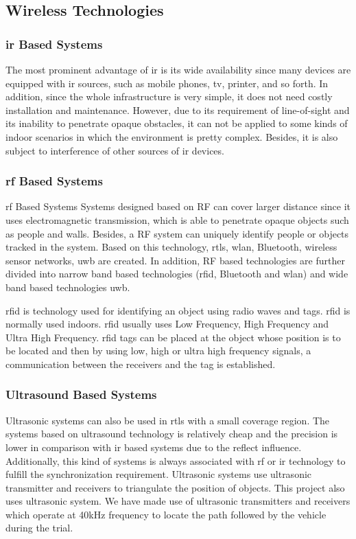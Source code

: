 \subsection{Wireless Technologies}

\subsubsection{\gls{ir} Based Systems}
The most prominent advantage of \gls{ir} is its wide availability since many devices are equipped with \gls{ir} sources, such as mobile phones, \gls{tv}, printer, and so forth. In addition, since the whole infrastructure is very simple, it does not need costly installation and maintenance. However, due to its requirement of line-of-sight and its inability to penetrate
opaque obstacles, it can not be applied to some kinds of indoor scenarios in which the environment is pretty complex. Besides, it is also subject to interference of other sources of \gls{ir} devices.

\subsubsection{\gls{rf} Based Systems}
\gls{rf} Based Systems Systems designed based on RF can cover larger distance since it uses electromagnetic transmission, which is able to penetrate opaque objects such as people and walls. Besides, a RF system can uniquely identify people or objects tracked in the system. Based on this technology, \gls{rtls}, \gls{wlan}, Bluetooth, wireless sensor networks, \gls{uwb} are created. In addition, RF based technologies are further divided into narrow band based technologies (\gls{rfid}, Bluetooth and \gls{wlan}) and wide band based technologies \gls{uwb}.

\gls{rfid} is technology used for identifying an object using radio waves and tags. \gls{rfid} is normally used indoors. \gls{rfid} usually uses Low Frequency, High Frequency and Ultra High Frequency. \gls{rfid} tags can be placed at the object whose position is to be located and then by using low, high or ultra high frequency signals, a communication between the receivers and the tag is established.



\subsubsection{Ultrasound Based Systems}
Ultrasonic systems can also be used in \gls{rtls} with a small coverage region. The systems based on ultrasound technology is relatively cheap and the precision is lower in comparison with \gls{ir} based systems due to the reflect influence. Additionally, this kind of systems is always associated with \gls{rf} or \gls{ir} technology to fulfill the synchronization requirement. Ultrasonic systems use ultrasonic transmitter and receivers to triangulate the position of objects. This project also uses ultrasonic system. We have made use of ultrasonic transmitters and receivers which operate at 40kHz frequency to locate the path followed by the vehicle during the trial.


